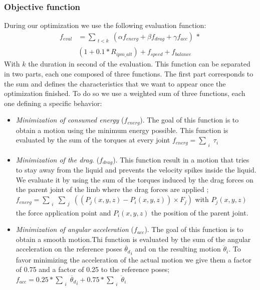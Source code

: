 \documentclass[conference]{acmsiggraph}
\begin{document}
\subsubsection{Objective function}
During our optimization we use the following evaluation function:
\begin{equation}
\begin{split}
f_{eval} &=\sum_{\substack{t<k}} (\alpha f_{energ} + \beta f_{drag} + \gamma f_{acc})\, *\\&(1+0.1* R_{ipm\_alt}) 
+ f_{speed} + f_{balance}
\label{eq:complete_eval}
\end{split}
\end{equation}
With $k$ the duration in second of the evaluation. This function can be separated in two parts, each one composed of three functions. The first part corresponds to the sum and defines the characteristics that we want to appear once the optimization finished. To do so we use a weighted sum of three functions, each one defining a specific behavior:
\begin{itemize}
\item{\textit{Minimization of consumed energy} ($f_{energ}$). The goal of this function is to obtain a motion using the minimum energy possible. This function is evaluated by the sum of the torques at every joint $f_{energ}=\sum_{\substack{i}}{\tau_i}$} 
\item{\textit{Minimization of the drag}. ($f_{drag}$). This function result in a motion that tries to stay away from the liquid and prevents the velocity spikes inside the liquid. We evaluate it by using the sum of the torques induced by the drag forces on the parent joint of the limb where the drag forces are applied ; $f_{energ}=\sum_{\substack{i}}\sum_{\substack{j}}((P_j(x,y,z)-P_i(x,y,z)) \times F_j)$ with  $P_j(x,y,z)$ the force application point and $P_i(x,y,z)$ the position of the parent joint.}
\item{\textit{Minimization of angular acceleration} ($f_{acc}$). The goal of this function is to obtain a smooth motion.Thi function is evaluated by the sum of the angular acceleration on the reference poses $\ddot{\theta_d}_i$ and on the resulting motion $\ddot{\theta}_i$. To favor minimizing the acceleration of the actual motion we give them a factor of 0.75 and a factor of 0.25 to the reference poses; $f_{acc}=0.25*\sum_{\substack{i}}\ddot{\theta_d}_i+0.75*\sum_{\substack{i}}\ddot{\theta}_i$ }
\end{itemize}
\end{document}
